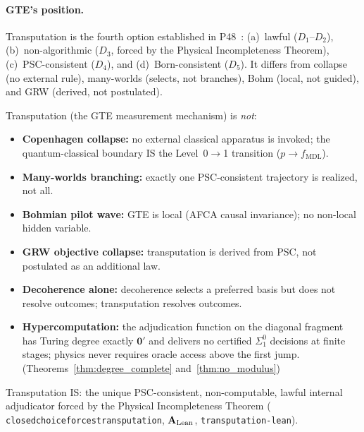 \documentclass[11pt]{article}
\theoremstyle{remark}
\newcommand{\lean}[1]{%
  \penalty-100
  \begingroup\def\_{\textunderscore\allowbreak}\texttt{#1}\endgroup}
\newcommand{\fmdl}{\ensuremath{f_{\mathrm{MDL}}}}
\newcommand{\CatAL}{\ensuremath{\textbf{A}_{\rm Lean}}}
\begin{document}
\paragraph{GTE's position.}
Transputation is the fourth option established in P48~\cite{SpivackGTECompleteFramework}:
(a)~lawful ($D_1$--$D_2$), (b)~non-algorithmic ($D_3$, forced by the Physical
Incompleteness Theorem), (c)~PSC-consistent ($D_4$), and (d)~Born-consistent
($D_5$).
It differs from collapse (no external rule), many-worlds (selects, not
branches), Bohm (local, not guided), and GRW (derived, not postulated).

\begin{tcolorbox}[colback=red!4,colframe=red!40,title={What Transputation Is Not},
  fonttitle=\bfseries,breakable]
\small
Transputation (the GTE measurement mechanism) is \emph{not}:
\begin{itemize}[leftmargin=1.8em,itemsep=2pt]
  \item \textbf{Copenhagen collapse:} no external classical apparatus is invoked; the quantum-classical
    boundary IS the Level~0$\to$1 transition ($p \to \fmdl{}$).
  \item \textbf{Many-worlds branching:} exactly one PSC-consistent trajectory is realized, not all.
  \item \textbf{Bohmian pilot wave:} GTE is local (AFCA causal invariance); no non-local hidden variable.
  \item \textbf{GRW objective collapse:} transputation is derived from PSC, not postulated as an additional law.
  \item \textbf{Decoherence alone:} decoherence selects a preferred basis but does not resolve outcomes;
    transputation resolves outcomes.
  \item \textbf{Hypercomputation:} the adjudication function on the diagonal fragment has Turing degree
    exactly $\mathbf{0}'$ and delivers no certified $\Sigma^0_1$ decisions at finite stages;
    physics never requires oracle access above the first jump.\\
    (Theorems~\ref{thm:degree_complete} and~\ref{thm:no_modulus})
\end{itemize}
Transputation IS: the unique PSC-consistent, non-computable, lawful internal adjudicator forced by
the Physical Incompleteness Theorem (\lean{closed\_choice\_forces\_transputation}, \CatAL,
\texttt{transputation-lean}).
\end{tcolorbox}


\end{document}
